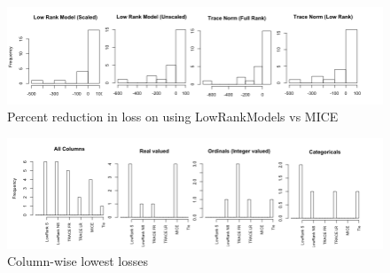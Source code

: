 \documentclass[11pt]{article} %
\begin{document}
\begin{figure}[H]
\caption*{Percent reduction in loss on using LowRankModels vs MICE}
\includegraphics[width = 1.2\textwidth]{PercentGain_Simulated}
\end{figure}

\begin{figure}[H]
\caption*{Column-wise lowest losses}
\includegraphics[width =1.2 \textwidth]{ColumnSelect_Simulated}
\end{figure}
\end{document}
